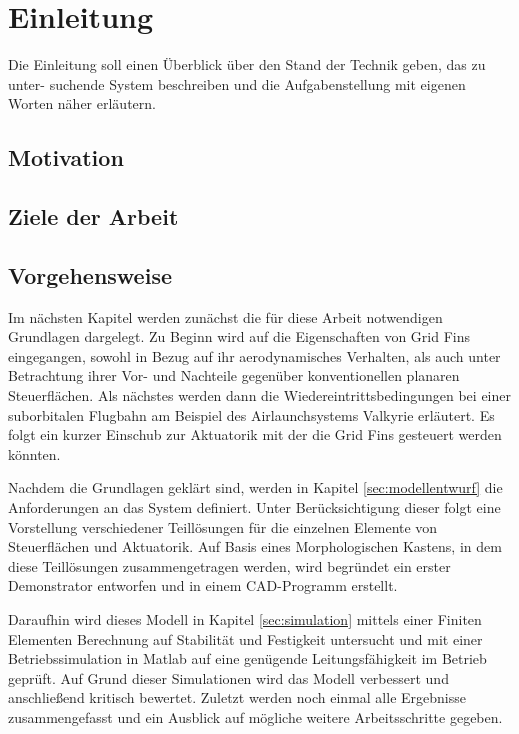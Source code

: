 \chapter{Einleitung}

Die Einleitung soll einen Überblick über den Stand der Technik geben, das zu unter-
suchende System beschreiben und die Aufgabenstellung mit eigenen Worten näher
erläutern.

\section{Motivation}

\section{Ziele der Arbeit}

\section{Vorgehensweise}
Im nächsten Kapitel werden zunächst die für diese Arbeit notwendigen Grundlagen dargelegt. Zu Beginn wird auf die Eigenschaften von Grid Fins eingegangen, sowohl in Bezug auf ihr aerodynamisches Verhalten, als auch unter Betrachtung ihrer Vor- und Nachteile gegenüber konventionellen planaren Steuerflächen. Als nächstes werden dann die Wiedereintrittsbedingungen bei einer suborbitalen Flugbahn am Beispiel des Airlaunchsystems Valkyrie erläutert. Es folgt ein kurzer Einschub zur Aktuatorik mit der die Grid Fins gesteuert werden könnten.

Nachdem die Grundlagen geklärt sind, werden in Kapitel \ref{sec:modellentwurf} die Anforderungen an das System definiert. Unter Berücksichtigung dieser folgt eine Vorstellung verschiedener Teillösungen für die einzelnen Elemente von Steuerflächen und Aktuatorik. Auf Basis eines Morphologischen Kastens, in dem diese Teillösungen zusammengetragen werden, wird begründet ein erster Demonstrator entworfen und in einem CAD-Programm erstellt.

Daraufhin wird dieses Modell in Kapitel \ref{sec:simulation} mittels einer Finiten Elementen Berechnung auf Stabilität und Festigkeit untersucht und mit einer Betriebssimulation in Matlab auf eine genügende
Leitungsfähigkeit im Betrieb geprüft. Auf Grund dieser Simulationen wird das Modell verbessert und anschließend kritisch bewertet.
Zuletzt werden noch einmal alle Ergebnisse zusammengefasst und ein Ausblick auf mögliche weitere Arbeitsschritte gegeben.